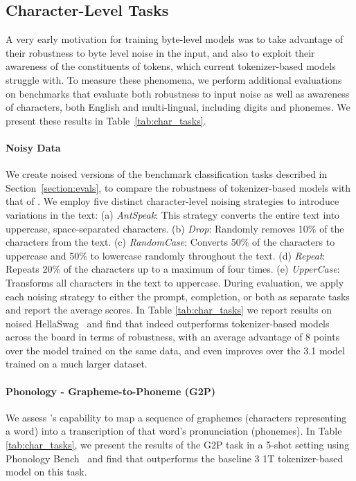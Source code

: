 \documentclass[]{fairmeta}
\begin{document}
\subsection{Character-Level Tasks}

A very early motivation for training byte-level models was to take advantage of their robustness to byte level noise in the input, and also to exploit their awareness of the constituents of tokens, which current tokenizer-based models struggle with. To measure these phenomena, we perform additional evaluations on benchmarks that evaluate both robustness to input noise as well as awareness of characters, both English and multi-lingual, including digits and phonemes. We present these results in Table~\ref{tab:char_tasks}.

\paragraph{Noisy Data} We create noised versions of the benchmark classification tasks described in Section~\ref{section:evals}, to compare the robustness of tokenizer-based models with that of \model{}.
We employ five distinct character-level noising strategies to introduce variations in the text: (a) \textit{AntSpeak}: This strategy converts the entire text into uppercase, space-separated characters. (b) \textit{Drop}: Randomly removes 10\% of the characters from the text. (c) \textit{RandomCase}: Converts 50\% of the characters to uppercase and 50\% to lowercase randomly throughout the text. (d) \textit{Repeat}:  Repeats 20\% of the characters up to a maximum of four times. (e) \textit{UpperCase}: Transforms all characters in the text to uppercase.
During evaluation, we apply each noising strategy to either the prompt, completion, or both as separate tasks and report the average scores. In Table \ref{tab:char_tasks} we report results on noised HellaSwag~\citep{Eval_hellaswag} and find that \model{} indeed outperforms tokenizer-based models across the board in terms of robustness, with an average advantage of 8 points over the model trained on the same data, and even improves over the \llama{} 3.1 model trained on a much larger dataset.

\paragraph{Phonology - Grapheme-to-Phoneme (G2P)}
We assess \model{}'s capability to map a sequence of graphemes (characters representing a word) into a transcription of that word's pronunciation (phonemes). In Table \ref{tab:char_tasks}, we present the results of the G2P task in a 5-shot setting using Phonology Bench~\citep{suvarna2024phonologybench} and find that \model{} outperforms the baseline \llama{} 3 1T tokenizer-based model on this task.
\end{document}

